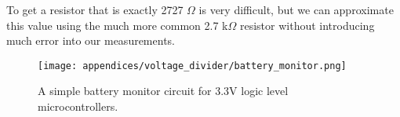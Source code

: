 To get a resistor that is exactly 2727 $\Omega$ is very difficult, but we can approximate this value using the much more common 2.7 k$\Omega$ resistor without introducing much error into our measurements.

\begin{figure}[h!]
    \caption{A simple battery monitor circuit for 3.3V logic level microcontrollers.}
    \centering
    \texttt{[image: appendices/voltage\_divider/battery\_monitor.png]}
\end{figure}
